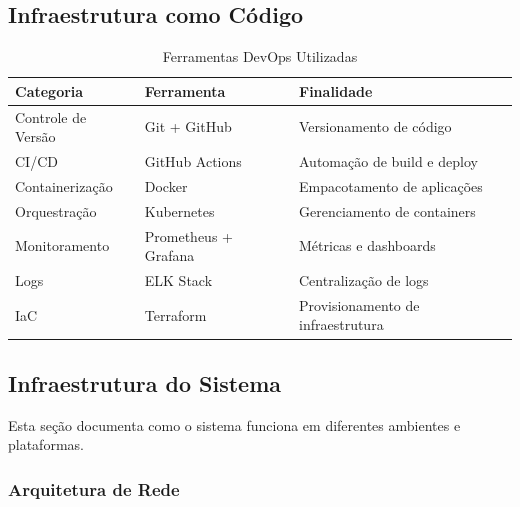 \documentclass[11pt,a4paper]{article}
\begin{document}
\subsection{Infraestrutura como Código}

\begin{table}[H]
\centering
\caption{Ferramentas DevOps Utilizadas}
\label{tab:devops-tools}
\begin{tabular}{|l|l|p{6cm}|}
\hline
\textbf{Categoria} & \textbf{Ferramenta} & \textbf{Finalidade} \\
\hline
Controle de Versão & Git + GitHub & Versionamento de código \\
CI/CD & GitHub Actions & Automação de build e deploy \\
Containerização & Docker & Empacotamento de aplicações \\
Orquestração & Kubernetes & Gerenciamento de containers \\
Monitoramento & Prometheus + Grafana & Métricas e dashboards \\
Logs & ELK Stack & Centralização de logs \\
IaC & Terraform & Provisionamento de infraestrutura \\
\hline
\end{tabular}
\end{table}

\subsection{Infraestrutura do Sistema}

Esta seção documenta como o sistema funciona em diferentes ambientes e plataformas.

\subsubsection{Arquitetura de Rede}
\end{document}
